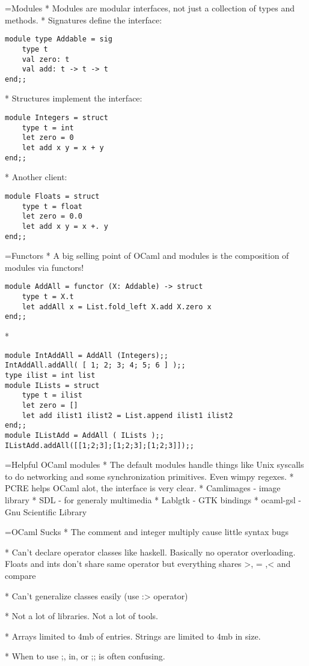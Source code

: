 \documentclass[titlepage,usenames,a4,landscape,semhelv]{seminar}
\begin{document}
\begin{slide}
=Modules
* Modules are modular interfaces, not just a collection of types and
methods.
* Signatures define the interface:
\begin{verbatim}
module type Addable = sig 
    type t 
    val zero: t
    val add: t -> t -> t
end;;
\end{verbatim}
* Structures implement the interface:
\begin{verbatim}
module Integers = struct
    type t = int
    let zero = 0
    let add x y = x + y
end;;
\end{verbatim}
* Another client:
\begin{verbatim}
module Floats = struct
    type t = float
    let zero = 0.0
    let add x y = x +. y
end;;
\end{verbatim}

=Functors
* A big selling point of OCaml and modules is the composition of
modules via functors!
\begin{verbatim}
module AddAll = functor (X: Addable) -> struct
    type t = X.t
    let addAll x = List.fold_left X.add X.zero x
end;;
\end{verbatim}
* 
\begin{verbatim}
module IntAddAll = AddAll (Integers);;
IntAddAll.addAll( [ 1; 2; 3; 4; 5; 6 ] );;
type ilist = int list
module ILists = struct
    type t = ilist
    let zero = []
    let add ilist1 ilist2 = List.append ilist1 ilist2
end;;
module IListAdd = AddAll ( ILists );;
IListAdd.addAll([[1;2;3];[1;2;3];[1;2;3]]);;
\end{verbatim}

=Helpful OCaml modules
* The default modules handle things like Unix syscalls to do networking and some synchronization primitives. Even wimpy regexes.
* PCRE helps OCaml alot, the interface is very clear.
* Camlimages - image library
* SDL - for generaly multimedia
* Lablgtk - GTK bindings
* ocaml-gsl - Gnu Scientific Library

=OCaml Sucks 
* The comment and integer multiply cause little syntax
bugs

* Can't declare operator classes like haskell. Basically no operator
overloading. Floats and ints don't share same operator but everything
shares >, = ,< and compare

* Can't generalize classes easily (use :> operator)

* Not a lot of libraries. Not a lot of tools.

* Arrays limited to 4mb of entries. Strings are limited to 4mb in size.

* When to use ;, in, or ;; is often confusing.


\end{slide}
\end{document}
